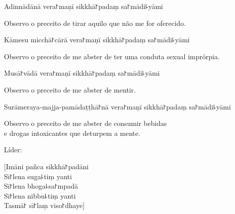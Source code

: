 \documentclass[
  babelLanguage=portuguese,
  final,
]{chantingbook}
\begin{document}
\begin{precept}
  \setcounter{enumi}{1}
  \item Adinnādānā vera꜓maṇī sikkhā꜓padaṃ sa꜓mādi꜕yāmi
\end{precept}

\begin{english}
  Observo o preceito de tirar aquilo que não me for oferecido.
\end{english}

\begin{precept}
  \setcounter{enumi}{2}
  \item Kāmesu micchā꜓cārā vera꜓maṇī sikkhā꜓padaṃ sa꜓mādi꜕yāmi
\end{precept}

\begin{english}
  Observo o preceito de me abster de ter uma conduta sexual imprórpia.
\end{english}

\begin{precept}
  \setcounter{enumi}{3}
  \item Musā꜓vādā vera꜓maṇī sikkhā꜓padaṃ sa꜓mādi꜕yāmi
\end{precept}

\enlargethispage{\baselineskip}

\begin{english}
  Observo o preceito de me abster de mentir.
\end{english}

\clearpage

\begin{precept}
  \setcounter{enumi}{4}
  \item Surāmeraya-majja-pamādaṭṭhā꜓nā vera꜓maṇī sikkhā꜓padaṃ sa꜓mādi꜕yāmi
\end{precept}

\begin{english}
  Observo o preceito de me abster de consumir bebidas\\
  e drogas intoxicantes que deturpem a mente.
\end{english}

\begin{instruction}
  Líder:
\end{instruction}

[Imāni pañca sikkhā꜓padāni\\
Sī꜓lena suga꜕tiṃ yanti\\
Sī꜓lena bhoga꜕sa꜓mpadā\\
Sī꜓lena nibbu꜕tiṃ yanti\\
Tasmā꜓ sī꜓laṃ viso꜓dhaye]
\end{document}
